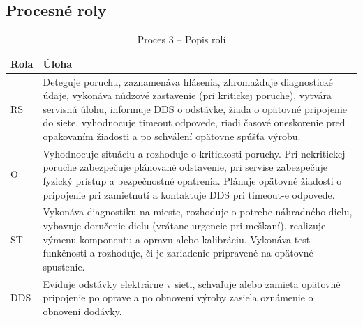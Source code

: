 \documentclass[12pt,a4paper]{article}
\begin{document}
\newpage
\subsection{Procesné roly}
\begin{table}[H]
  \centering
  \renewcommand{\arraystretch}{1.2}
  \begin{tabularx}{\textwidth}{|p{}|X|}
    \hline
    \textbf{Rola} & \textbf{Úloha} \\
    \hline
    RS & Deteguje poruchu, zaznamenáva hlásenia, zhromažďuje
    diagnostické údaje, vykonáva núdzové zastavenie (pri kritickej poruche),
    vytvára servisnú úlohu, informuje DDS o odstávke, žiada o opätovné
    pripojenie do siete, vyhodnocuje timeout odpovede, riadi časové oneskorenie
    pred opakovaním žiadosti a po schválení opätovne spúšťa výrobu. \\
    \hline
    O & Vyhodnocuje situáciu a rozhoduje o kritickosti
    poruchy. Pri nekritickej poruche zabezpečuje plánované odstavenie,
    pri servise zabezpečuje fyzický prístup a bezpečnostné opatrenia.
    Plánuje opätovné žiadosti o pripojenie pri zamietnutí a kontaktuje
    DDS pri timeout-e odpovede. \\
    \hline
    ST & Vykonáva diagnostiku na mieste, rozhoduje
    o potrebe náhradného dielu, vybavuje doručenie dielu (vrátane
    urgencie pri meškaní), realizuje výmenu komponentu a opravu
    alebo kalibráciu. Vykonáva test funkčnosti a rozhoduje, či je
    zariadenie pripravené na opätovné spustenie. \\
    \hline
    DDS & Eviduje odstávky elektrárne v sieti,
    schvaľuje alebo zamieta opätovné pripojenie po oprave a po obnovení
    výroby zasiela oznámenie o obnovení dodávky. \\
    \hline
  \end{tabularx}
  \caption{Proces 3 -- Popis rolí}
\end{table}

\newpage
\end{document}
